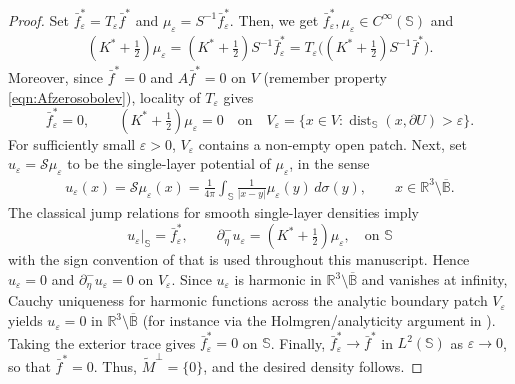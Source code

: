 \documentclass[a4paper, 11pt]{article}
\renewcommand{\SS}{\mathbb{S}}
\newcommand{\BB}{\mathbb{B}}
\newcommand{\R}{\mathbb{R}}
\begin{document}
\begin{proof}
Set $\bar f^{\ast}_\varepsilon=T_\varepsilon\bar f^{\ast}$ and
$\mu_\varepsilon=S^{-1}\bar f^{\ast}_\varepsilon$. Then, we get $\bar f^{\ast}_\varepsilon,\mu_\varepsilon\in C^\infty(\SS)$ and
\begin{align}
(K^{\ast}+\tfrac{1}{2})\mu_\varepsilon
=(K^{\ast}+\tfrac{1}{2})S^{-1}\bar f^{\ast}_\varepsilon
=T_\varepsilon\big((K^{\ast}+\tfrac{1}{2})S^{-1}\bar f^{\ast}\big).
\end{align}
Moreover, since $\bar f^{\ast}=0$ and $A\bar f^\ast=0$ on $V$ (remember property \eqref{eqn:Afzerosobolev}), locality of $T_\varepsilon$ gives
\[
	\bar f^{\ast}_\varepsilon=0,\qquad (K^{\ast}+\tfrac12)\mu_\varepsilon=0
	\quad\text{on}\quad
	V_\varepsilon=\{x\in V:\operatorname{dist}_{\SS}(x,\partial U)>\varepsilon\}.
\]
For sufficiently small $\varepsilon>0$, $V_\varepsilon$ contains a non-empty open patch. Next, set $u_\varepsilon=\mathcal{S}\mu_\varepsilon$ to be the single-layer potential of $\mu_\varepsilon$, in the sense
\begin{align}
	u_\varepsilon(x)=\mathcal{S}\mu_\varepsilon(x)=\frac{1}{4\pi}\int_\SS\frac{1}{|x-y|}\mu_\varepsilon(y)\,d\sigma(y),\qquad x\in\R^3\setminus\overline{\BB}.
\end{align} 
The classical jump relations for smooth single-layer densities imply
\[
	u_\varepsilon|_{\SS}=\bar f^{\ast}_\varepsilon,\qquad
	\partial_\eta^- u_\varepsilon=(K^{\ast}+\tfrac12)\mu_\varepsilon,
	\quad\text{on }\SS
\]
with the sign convention of \cite{BGK} that is used throughout this manuscript. Hence $u_\varepsilon=0$ and $\partial_\eta^- u_\varepsilon=0$ on $V_\varepsilon$. Since $u_\varepsilon$ is harmonic in $\R^3\setminus\overline{\BB}$ and vanishes at infinity, Cauchy uniqueness for harmonic functions across the analytic boundary patch $V_\varepsilon$ yields $u_\varepsilon=0$ in $\R^3\setminus\overline{\BB}$ (for instance via the Holmgren/analyticity argument in \cite[Lemma~1]{atfeh10}). Taking the exterior trace gives $\bar f^{\ast}_\varepsilon=0$ on $\SS$. Finally, $\bar f^{\ast}_\varepsilon\to\bar f^{\ast}$ in $L^2(\SS)$ as $\varepsilon\to0$, so that $\bar f^{\ast}=0$. Thus, $\tilde{M}^\perp=\{0\}$, and the desired density follows.

\end{proof}
\end{document}
